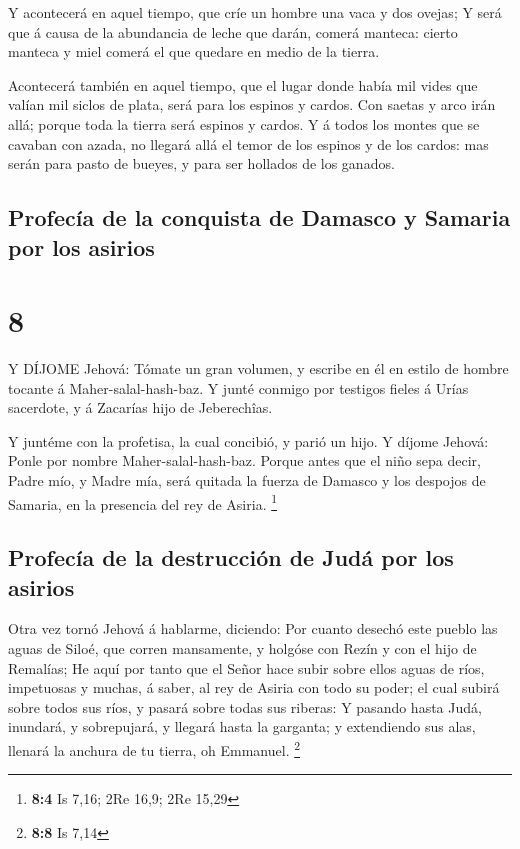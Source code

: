  Y acontecerá en aquel tiempo, que críe un hombre una vaca
y dos ovejas;  Y será que á causa de la abundancia de leche
que darán, comerá manteca: cierto manteca y miel comerá el que quedare
en medio de la tierra.

 Acontecerá también en aquel tiempo, que el lugar donde
había mil vides que valían mil siclos de plata, será para los espinos y
cardos.  Con saetas y arco irán allá; porque toda la tierra
será espinos y cardos.  Y á todos los montes que se cavaban
con azada, no llegará allá el temor de los espinos y de los cardos: mas
serán para pasto de bueyes, y para ser hollados de los ganados.

\hypertarget{profecuxeda-de-la-conquista-de-damasco-y-samaria-por-los-asirios}{%
\subsection{Profecía de la conquista de Damasco y Samaria por los
asirios}\label{profecuxeda-de-la-conquista-de-damasco-y-samaria-por-los-asirios}}

\hypertarget{section-7}{%
\section{8}\label{section-7}}

 Y DÍJOME Jehová: Tómate un gran volumen, y escribe en él en
estilo de hombre tocante á Maher-salal-hash-baz.  Y junté
conmigo por testigos fieles á Urías sacerdote, y á Zacarías hijo de
Jeberechîas.

 Y juntéme con la profetisa, la cual concibió, y parió un
hijo. Y díjome Jehová: Ponle por nombre Maher-salal-hash-baz.
 Porque antes que el niño sepa decir, Padre mío, y Madre
mía, será quitada la fuerza de Damasco y los despojos de Samaria, en la
presencia del rey de Asiria. \footnote{\textbf{8:4} Is 7,16; 2Re 16,9;
  2Re 15,29}

\hypertarget{profecuxeda-de-la-destrucciuxf3n-de-juduxe1-por-los-asirios}{%
\subsection{Profecía de la destrucción de Judá por los
asirios}\label{profecuxeda-de-la-destrucciuxf3n-de-juduxe1-por-los-asirios}}

 Otra vez tornó Jehová á hablarme, diciendo: 
Por cuanto desechó este pueblo las aguas de Siloé, que corren
mansamente, y holgóse con Rezín y con el hijo de Remalías; 
He aquí por tanto que el Señor hace subir sobre ellos aguas de ríos,
impetuosas y muchas, á saber, al rey de Asiria con todo su poder; el
cual subirá sobre todos sus ríos, y pasará sobre todas sus riberas:
 Y pasando hasta Judá, inundará, y sobrepujará, y llegará
hasta la garganta; y extendiendo sus alas, llenará la anchura de tu
tierra, oh Emmanuel. \footnote{\textbf{8:8} Is 7,14}

